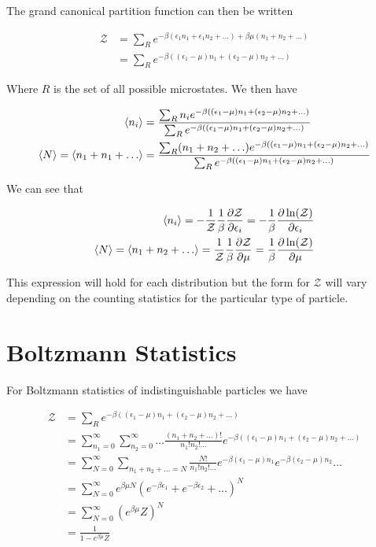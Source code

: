 \documentclass[12pt]{article}
\newcommand{\ep}{\epsilon}
\newcommand{\mc}[1]{\mathcal{#1}}
\begin{document}
The grand canonical partition function can then be written

\begin{align}
\mc{Z} &= \sum_R e^{-\beta(\ep_1 n_1 + \ep_1 n_2 + \ldots) + \beta \mu (n_1+n_2+\ldots)}\\
&= \sum_R e^{-\beta((\ep_1-\mu)n_1 + (\ep_2-\mu)n_2+\ldots)}
\end{align}

Where $R$ is the set of all possible microstates. We then have

\begin{align}
\braket{n_i} &= \frac{\sum_R n_i e^{-\beta((\ep_1-\mu) n_1 + (\ep_2 -\mu)n_2 + \ldots)}}{\sum_R e^{-\beta((\ep_1-\mu) n_1 + (\ep_2-\mu) n_2 + \ldots)}}\\
\braket{N} = \braket{n_1+n_1+\ldots} &= \frac{\sum_R (n_1+n_2+\ldots) e^{-\beta((\ep_1-\mu) n_1 + (\ep_2 -\mu)n_2 + \ldots)}}{\sum_R e^{-\beta((\ep_1-\mu) n_1 + (\ep_2-\mu) n_2 + \ldots)}}
\end{align}

We can see that

\begin{align}
\braket{n_i} = -\frac{1}{\mc{Z}}\frac{1}{\beta} \frac{\partial \mc{Z}}{\partial \epsilon_i} = -\frac{1}{\beta}\frac{\partial \ln(\mc{Z})}{\partial \epsilon_i}\\
\braket{N} = \braket{n_1+n_2+\ldots} = \frac{1}{\mc{Z}}\frac{1}{\beta}\frac{\partial\mc{Z}}{\partial \mu} = \frac{1}{\beta}\frac{\partial\ln(\mc{Z})}{\partial \mu}
\end{align}

This expression will hold for each distribution but the form for $\mc{Z}$ will vary depending on the counting statistics for the particular type of particle.

\section{Boltzmann Statistics}

For Boltzmann statistics of indistinguishable particles we have

\begin{align}
\mc{Z} &= \sum_R e^{-\beta((\ep_1-\mu)n_1 + (\ep_2-\mu)n_2+\ldots)}\\
&= \sum_{n_1=0}^{\infty}\sum_{n_2=0}^{\infty}\ldots \frac{(n_1+n_2+\ldots)!}{n_1!n_2!\ldots}e^{-\beta((\ep_1-\mu)n_1 + (\ep_2-\mu)n_2+\ldots)}\\
&= \sum_{N=0}^{\infty} \sum_{n_1+n_2+\ldots=N} \frac{N!}{n_1!n_2!\ldots}e^{-\beta(\ep_1-\mu)n_1} e^{-\beta(\ep_2-\mu)n_2}\ldots\\
&= \sum_{N=0}^{\infty} e^{\beta\mu N}(e^{-\beta \epsilon_1} + e^{-\beta\epsilon_2}+\ldots)^N\\
&= \sum_{N=0}^{\infty}\left(e^{\beta \mu} Z \right)^N\\
&= \frac{1}{1-e^{\beta\mu}Z}
\end{align}
\end{document}
